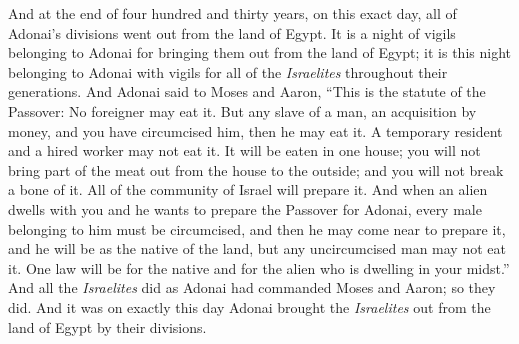 \begin{biblechapter}
\verse And at the end of four hundred and thirty years, on this exact day, all of Adonai’s divisions went out from the land of Egypt.
\verse It is a night of vigils belonging to Adonai for bringing them out from the land of Egypt; it is this night belonging to Adonai with vigils for all of the \textit{Israelites} throughout their generations.
\verse And Adonai said to Moses and Aaron, “This is the statute of the Passover: No foreigner may eat it.
\verse But any slave of a man, an acquisition by money, and you have circumcised him, then he may eat it.
\verse A temporary resident and a hired worker may not eat it.
\verse It will be eaten in one house; you will not bring part of the meat out from the house to the outside; and you will not break a bone of it.
\verse All of the community of Israel will prepare it.
\verse And when an alien dwells with you and he wants to prepare the Passover for Adonai, every male belonging to him must be circumcised, and then he may come near to prepare it, and he will be as the native of the land, but any uncircumcised man may not eat it.
\verse One law will be for the native and for the alien who is dwelling in your midst.”
\verse And all the \textit{Israelites} did as Adonai had commanded Moses and Aaron; so they did.
\verse And it was on exactly this day Adonai brought the \textit{Israelites} out from the land of Egypt by their divisions.
\end{biblechapter}

